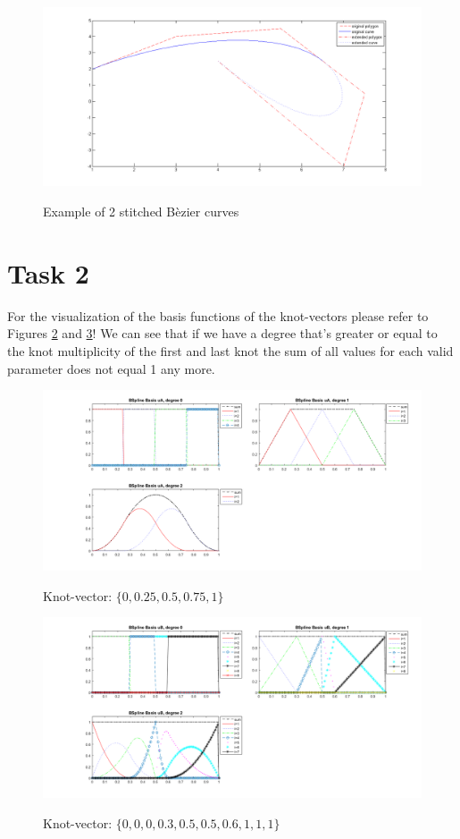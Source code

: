 \documentclass[12pt,a4paper]{article}
\begin{document}
\begin{figure}[hbtp]
\caption{Example of 2 stitched Bèzier curves}
\centering
\includegraphics[width=\textwidth]{newBranch.png}
\label{fig:1}
\end{figure}

\section{Task 2}
For the visualization of the basis functions of the knot-vectors please refer to Figures \ref{fig:2a} and \ref{fig:2b}! We can see that if we have a degree that's greater or equal to the knot multiplicity of the first and last knot the sum of all values for each valid parameter does not equal 1 any more.

\begin{figure}[hbtp]
\caption{Knot-vector: $\{0, 0.25, 0.5, 0.75, 1\}$}
\centering
\includegraphics[width=\textwidth]{basisFunctA.png}
\label{fig:2a}
\end{figure}

\begin{figure}[hbtp]
\caption{Knot-vector: $\{0, 0, 0, 0.3, 0.5, 0.5, 0.6, 1, 1, 1\}$}
\centering
\includegraphics[width=\textwidth]{basisFunctB.png}
\label{fig:2b}
\end{figure}
\end{document}
